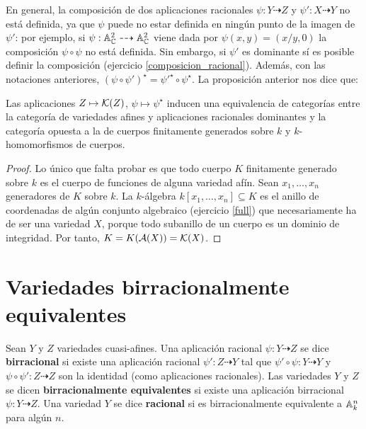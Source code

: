 \documentclass[ACGA.tex]{subfiles}
\begin{document}
En general, la composición de dos aplicaciones racionales $\psi:Y\dashrightarrow Z$ y $\psi':X\dashrightarrow Y$ no está definida, ya que $\psi$ puede no estar definida en ningún punto de la imagen de $\psi'$: por ejemplo, si $\psi:\mathbb{A}^2_{\mathbb{C}}\dashrightarrow\mathbb{A}^2_{\mathbb{C}}$ viene dada por $\psi(x,y)=(x/y,0)$ la composición $\psi\circ \psi$  no está definida. Sin embargo, si $\psi'$ es dominante sí es posible definir la composición (ejercicio \ref{composicion_racional}). Además, con las notaciones anteriores, $(\psi\circ\psi')^\star=\psi'^\star\circ\psi^\star$. La proposición anterior nos dice que:

\begin{prop}
  Las aplicaciones $Z\mapsto {\mathcal K}(Z)$, $\psi\mapsto \psi^\star$ inducen una equivalencia de categorías entre la categoría de variedades afines y aplicaciones racionales dominantes y la categoría opuesta a la de cuerpos finitamente generados sobre $k$ y $k$-homomorfismos de cuerpos.
\end{prop}

\begin{proof}
 Lo único que falta probar es que todo cuerpo $K$ finitamente generado sobre $k$ es el cuerpo de funciones de alguna variedad afín. Sean $x_1,\ldots,x_n$ generadores de $K$ sobre $k$. La $k$-álgebra $k[x_1,\ldots,x_n]\subseteq K$ es el anillo de coordenadas de algún conjunto algebraico (ejercicio \ref{full}) que necesariamente ha de ser una variedad $X$, porque todo subanillo de un cuerpo es un dominio de integridad. Por tanto, $K=K(\mathcal{A}(X))={\mathcal K}(X)$.
\end{proof}


\section{Variedades birracionalmente equivalentes}


\begin{defi}
 Sean $Y$ y $Z$ variedades cuasi-afines. Una aplicación racional $\psi:Y\dashrightarrow Z$ se dice {\bf birracional} si existe una aplicación racional $\psi':Z\dashrightarrow Y$ tal que $\psi'\circ\psi:Y\dashrightarrow Y$ y $\psi\circ\psi':Z\dashrightarrow Z$ son la identidad (como aplicaciones racionales). Las variedades $Y$ y $Z$ se dicen {\bf birracionalmente equivalentes} si existe una aplicación birracional $\psi:Y\dashrightarrow Z$. Una variedad $Y$ se dice {\bf racional} si es birracionalmente equivalente a $\mathbb{A}^n_k$ para algún $n$.
\end{defi}
\end{document}
